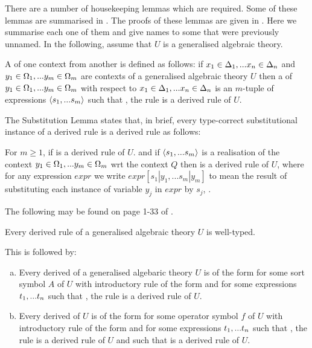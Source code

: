  There are a number of housekeeping lemmas which are required. Some of these lemmas are summarised in \cite{Cartmell86}. The proofs of these lemmas 
	are given in \cite{Cartmell78}.
Here we summarise each one of them and give names to some that were previously unnamed. In the following, assume that $U$ is a generalised algebraic theory.

 
A  of one context from another is defined as follows: if $x_1 \in \Delta_1,... x_{n} \in \Delta_{n}$ and $y_1 \in \Omega_1,... y_{m} \in \Omega_{m}$ are contexts of a generalised algebraic theory $U$  then a  of  $y_1 \in \Omega_1,... y_{m} \in \Omega_{m}$ with respect to $x_1 \in \Delta_1,... x_{n} \in \Delta_{n}$ is an $m$-tuple of expressions $\langle s_1,...s_m\rangle$
such that \foreachj, the rule  is a derived rule of $U$.


The Substitution Lemma states that, in brief, every type-correct substitutional instance of a derived rule is a derived rule as follows:
\begin{lemma}
For $m \geq 1$, if  is a derived rule of $U$.
and  if $\langle s_1,...s_m\rangle$ is a realisation of the context $y_1 \in \Omega_1,... y_{m} \in \Omega_{m}$ wrt the context $Q$ 
then  is a derived rule of $U$, where
for any expression $expr$ we write
$expr[s_1|y_1,...s_m|y_m]$ to mean
the result of substituting each instance of variable $y_j$ in $expr$ by $s_j$, \foreachj.
\end{lemma}

The following may be found on page 1-33 of \cite{Cartmell78}.
\begin{lemma}
Every derived rule of a generalised algebraic theory $U$ is well-typed.
\end{lemma} 

This is followed by:
\begin{lemma}
\begin{enumerate}[(a)]
\item Every derived \Trule of a generalised algebaric theory $U$ is of the form
 for some sort symbol $A$ of $U$ with introductory rule of the form
 and for some expressions $t_1,...t_n$ such that \foreachi, the rule
 is a derived rule of $U$.

\item Every derived \trule of $U$ is of the form
 for some operator symbol $f$ of $U$ 
with introductory rule of the form
and for some expressions $t_1,...t_n$ such that \foreachi, the rule
 is a derived rule of $U$
and such that
 is a derived rule of $U$.
\end{enumerate}
\end{lemma}

